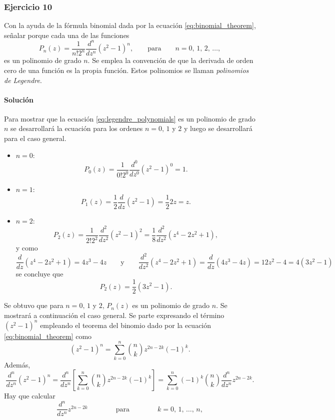 \documentclass[a4paper]{report}
\begin{document}
\subsubsection{Ejercicio 10}

Con la ayuda de la fórmula binomial dada por la ecuación \ref{eq:binomial_theorem}, señalar porque cada una de las funciones 
\begin{equation}\label{eq:legendre_polynomials}
  P_n(z)=\frac{1}{n!2^n}\frac{d^n}{dz^n}(z^2-1)^n,\qquad\textrm{para}\qquad n=0,\,1,\,2,\,\dots,
\end{equation}
es un polinomio de grado \(n\). Se emplea la convención de que la derivada de orden cero de una función es la propia función. Estos polinomios se llaman \emph{polinomios de Legendre}.

\paragraph{Solución} Para mostrar que la ecuación \ref{eq:legendre_polynomials} es un polinomio de grado \(n\) se desarrollará la ecuación para los ordenes \(n=0,\,1\) y \(2\) y luego se desarrollará para el caso general.
\begin{itemize}
 \item \(n=0\):
 \[
  P_0(z)=\frac{1}{0!2^0}\frac{d^0}{dz^0}(z^2-1)^0=1.
 \]
 \item \(n=1\):
 \[
  P_1(z)=\frac{1}{2}\frac{d}{dz}(z^2-1)=\frac{1}{2}2z=z.
 \]
 \item \(n=2\):
 \[
  P_2(z)=\frac{1}{2!2^2}\frac{d^2}{dz^2}(z^2-1)^2=\frac{1}{8}\frac{d^2}{dz^2}(z^4-2z^2+1),
 \]
 y como
 \[
  \frac{d}{dz}(z^4-2z^2+1)=4z^3-4z
  \qquad\textrm{y}\qquad
  \frac{d^2}{dz^2}(z^4-2z^2+1)=\frac{d}{dz}(4z^3-4z)=12z^2-4=4(3z^2-1)
 \]
 se concluye que 
 \[
  P_2(z)=\frac{1}{2}(3z^2-1).
 \]
\end{itemize}
Se obtuvo que para \(n=0,\,1\) y \(2\), \(P_n(z)\) es un polinomio de grado \(n\). Se mostrará a continuación el caso general. Se parte expresando el término \((z^2-1)^n\) empleando el teorema del binomio dado por la ecuación \ref{eq:binomial_theorem} como 
\[
 (z^2-1)^n=\sum_{k=0}^n\binom{n}{k}z^{2n-2k}(-1)^k.
\]
Además,
\begin{equation}\label{eq:exersice_20_10_derivative}
 \frac{d^n}{dz^n}(z^2-1)^n=\frac{d^n}{dz^n}\left[\sum_{k=0}^n\binom{n}{k}z^{2n-2k}(-1)^k\right]
 =\sum_{k=0}^n(-1)^k\binom{n}{k}\frac{d^n}{dz^n}z^{2n-2k}.
\end{equation}
Hay que calcular
\[
 \frac{d^n}{dz^n}z^{2n-2k}\qquad\qquad\textrm{para}\qquad\qquad k=0,\,1,\,\dots,\,n,
\]
\end{document}
